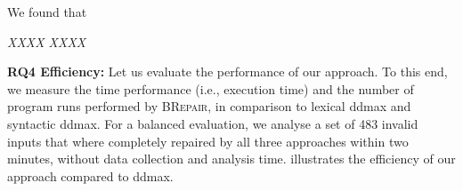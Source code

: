 \documentclass[sigconf,review,anonymous]{acmart}
\newenvironment{result}{\begin{framed}\centering\it}{\end{framed}}
\newcounter{todocounter}
\newcommand{\todo}[1]{\marginpar{$|$}\textcolor{red}{\stepcounter{todocounter}\footnote[\thetodocounter]{\textcolor{red}{\textbf{TODO }}\textit{#1}}}}
\newcommand{\recheck}[1]{\textcolor{red}{#1}}
\renewcommand{\todo}[1]{}
\newcommand{\approach}{\textsc{BRepair}\xspace}
\begin{document}
We found that

\begin{result}
XXXX
XXXX
\end{result}





\noindent
\textbf{RQ4 Efficiency:}
Let us evaluate the performance of our approach.
To this end, we measure the time performance (i.e., execution time) and the number of program runs performed
by \approach, in comparison to lexical ddmax and syntactic ddmax. For a balanced evaluation, we
analyse a set of 483 invalid inputs %
that where completely repaired by all three approaches within %
two minutes, %
without %
data collection and %
analysis time.
illustrates the efficiency of our approach compared to ddmax. %

\end{document}
